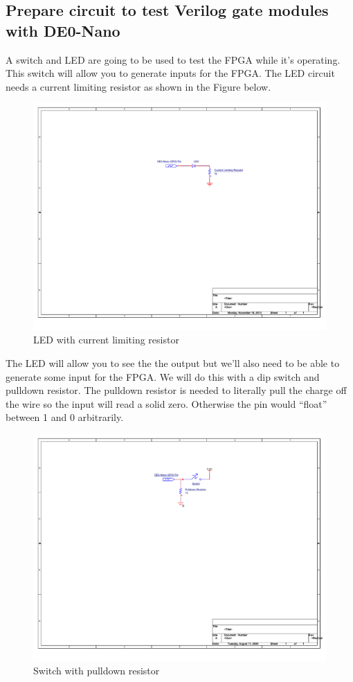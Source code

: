 \documentclass[12pt,journal]{IEEEtran}
\begin{document}
    \subsection{Prepare circuit to test Verilog gate modules with DE0-Nano}
      A switch and LED are going to be used to test the FPGA while it's operating. This switch will allow you to generate inputs for the FPGA. The LED circuit needs a current limiting resistor as shown in the Figure below.
      \begin{figure}[H]
        \label{LEDCircuit}
        \includegraphics[width=.48\textwidth]{Schematics/LED.pdf}
        \caption{LED with current limiting resistor}
      \end{figure}
      The LED will allow you to see the the output but we'll also need to be able to generate some input for
      the FPGA. We will do this with a dip switch and pulldown resistor. The pulldown resistor is needed
      to literally pull the charge off the wire so the input will read a solid zero. Otherwise the pin would ``float''
      between 1 and 0 arbitrarily.
      \begin{figure}[H]
        \label{swPulldown}
        \includegraphics[width=.48\textwidth]{Schematics/SwitchCircuit.pdf}
        \caption{Switch with pulldown resistor}
      \end{figure}

\end{document}
